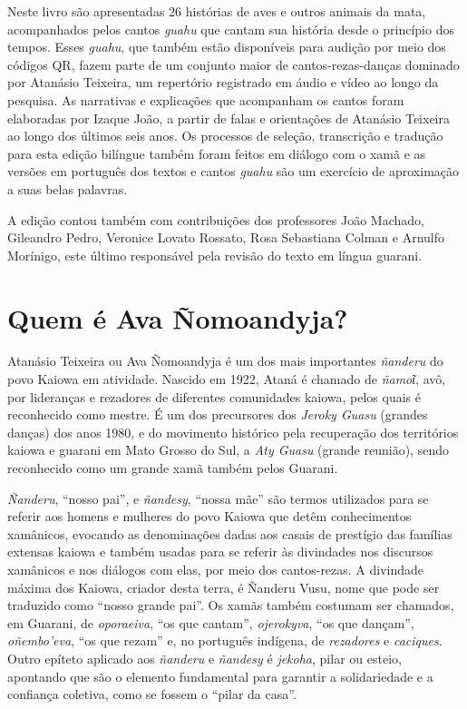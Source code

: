 Neste livro são apresentadas 26 histórias de aves e outros animais da
mata, acompanhados pelos cantos \emph{guahu} que cantam sua história
desde o princípio dos tempos. Esses \emph{guahu}, que também estão
disponíveis para audição por meio dos códigos QR, fazem parte de um
conjunto maior de cantos-rezas-danças dominado por Atanásio Teixeira, um
repertório registrado em áudio e vídeo ao longo da pesquisa. As
narrativas e explicações que acompanham os cantos foram elaboradas por
Izaque João, a partir de falas e orientações de Atanásio Teixeira ao
longo dos últimos seis anos. Os processos de seleção, transcrição e
tradução para esta edição bilíngue também foram feitos em diálogo com o
xamã e as versões em português dos textos e cantos \emph{guahu} são um
exercício de aproximação a suas belas palavras.

A edição contou também com contribuições dos professores João Machado,
Gileandro Pedro, Veronice Lovato Rossato, Rosa Sebastiana Colman e
Arnulfo Morínigo, este último responsável pela revisão do texto em
língua guarani.

\chapter{Quem é Ava Ñomoandyja?}

Atanásio Teixeira ou Ava Ñomoandyja é um dos mais importantes
\emph{ñanderu} do povo Kaiowa em atividade. Nascido em 1922, Ataná é
chamado de \emph{ñamoῖ}, avô, por lideranças e rezadores de diferentes
comunidades kaiowa, pelos quais é reconhecido como mestre. É um dos
precursores dos \emph{Jeroky Guasu} (grandes danças) dos anos 1980, e do
movimento histórico pela recuperação dos territórios kaiowa e guarani em
Mato Grosso do Sul, a \emph{Aty Guasu} (grande reunião), sendo
reconhecido como um grande xamã também pelos Guarani.

\emph{Ñanderu}, ``nosso pai'', e \emph{ñandesy}, ``nossa mãe'' são
termos utilizados para se referir aos homens e mulheres do povo Kaiowa
que detêm conhecimentos xamânicos, evocando as denominações dadas aos
casais de prestígio das famílias extensas kaiowa e também usadas para se
referir às divindades nos discursos xamânicos e nos diálogos com elas,
por meio dos cantos-rezas. A divindade máxima dos Kaiowa, criador desta
terra, é Ñanderu Vusu, nome que pode ser traduzido como ``nosso grande
pai''. Os xamãs também costumam ser chamados, em Guarani, de
\emph{oporaeiva}, ``os que cantam'', \emph{ojerokyva}, ``os que
dançam'', \emph{oñembo'eva}, ``os que rezam'' e, no português indígena,
de \emph{rezadores} e \emph{caciques}. Outro epíteto aplicado aos
\emph{ñanderu} e \emph{ñandesy} é \emph{jekoha}, pilar ou esteio,
apontando que são o elemento fundamental para garantir a solidariedade e
a confiança coletiva, como se fossem o ``pilar da casa''.

